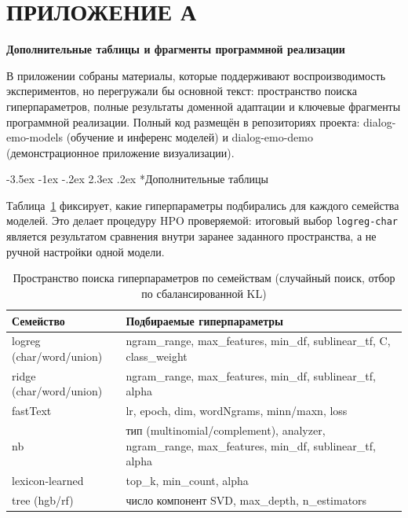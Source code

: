 \documentclass[12pt,a4paper]{report}
\makeatletter
\renewcommand{\section}{\@startsection{section}{1}{\z@}%
  {-3.5ex \@plus -1ex \@minus -.2ex}%
  {2.3ex \@plus .2ex}%
  {\normalfont\large\bfseries\centering}}
\makeatother
\begin{document}
\clearpage
\chapter*{ПРИЛОЖЕНИЕ А}
\label{app:code}
\begin{center}\textbf{Дополнительные таблицы и фрагменты программной реализации}\end{center}
\renewcommand{\thetable}{А.\arabic{table}}\renewcommand{\theHtable}{appA.\arabic{table}}\setcounter{table}{0}

В приложении собраны материалы, которые поддерживают воспроизводимость экспериментов, но перегружали бы основной текст: пространство поиска гиперпараметров, полные результаты доменной адаптации и ключевые фрагменты программной реализации. Полный код размещён в репозиториях проекта: dialog-emo-models (обучение и инференс моделей) и dialog-emo-demo (демонстрационное приложение визуализации).

\section*{Дополнительные таблицы}

Таблица~\ref{tab:hpospace} фиксирует, какие гиперпараметры подбирались для каждого семейства моделей. Это делает процедуру HPO проверяемой: итоговый выбор \texttt{logreg-char} является результатом сравнения внутри заранее заданного пространства, а не ручной настройки одной модели.

\begin{table}[H]
  \caption{Пространство поиска гиперпараметров по семействам (случайный поиск, отбор по сбалансированной KL)}
  \label{tab:hpospace}
  \centering
  {\small
  \begin{tabular}{|p{3.3cm}|p{10.0cm}|}
    \hline
    Семейство & Подбираемые гиперпараметры \\
    \hline
    logreg (char/word/union) & ngram\_range, max\_features, min\_df, sublinear\_tf, C, class\_weight \\
    \hline
    ridge (char/word/union) & ngram\_range, max\_features, min\_df, sublinear\_tf, alpha \\
    \hline
    fastText & lr, epoch, dim, wordNgrams, minn/maxn, loss \\
    \hline
    nb & тип (multinomial/complement), analyzer, ngram\_range, max\_features, min\_df, sublinear\_tf, alpha \\
    \hline
    lexicon-learned & top\_k, min\_count, alpha \\
    \hline
    tree (hgb/rf) & число компонент SVD, max\_depth, n\_estimators \\
    \hline
  \end{tabular}
  }
\end{table}
\end{document}

